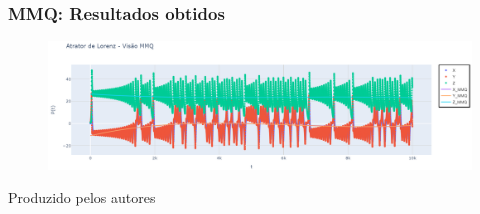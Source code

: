 
\begin{frame}
    \frametitle{MMQ: Resultados obtidos}
    \begin{figure}
        \centering
        \includegraphics[width=1.0\textwidth]{01_docs/00_Relatorio/img/mmq.png}
    \end{figure}

    \vspace{0.2cm}

        \begin{center}
        {\tiny Produzido pelos autores}
    \end{center}
    
\end{frame}


